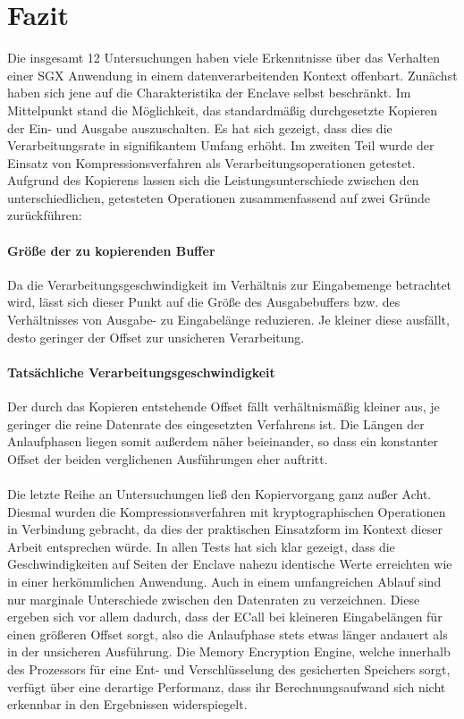 \section{Fazit}

Die insgesamt 12 Untersuchungen haben viele Erkenntnisse über das Verhalten einer \ac{SGX} Anwendung in einem datenverarbeitenden Kontext offenbart. Zunächst haben sich jene auf die Charakteristika der Enclave selbst beschränkt. Im Mittelpunkt stand die Möglichkeit, das standardmäßig durchgesetzte Kopieren der Ein- und Ausgabe auszuschalten. Es hat sich gezeigt, dass dies die Verarbeitungsrate in signifikantem Umfang erhöht. Im zweiten Teil wurde der Einsatz von Kompressionsverfahren als Verarbeitungsoperationen getestet. Aufgrund des Kopierens lassen sich die Leistungsunterschiede zwischen den unterschiedlichen, getesteten Operationen zusammenfassend auf zwei Gründe zurückführen:

\paragraph{Größe der zu kopierenden Buffer}
Da die Verarbeitungsgeschwindigkeit im Verhältnis zur Eingabemenge betrachtet wird, lässt sich dieser Punkt auf die Größe des Ausgabebuffers bzw. des Verhältnisses von Ausgabe- zu Eingabelänge reduzieren. Je kleiner diese ausfällt, desto geringer der Offset zur unsicheren Verarbeitung.

\paragraph{Tatsächliche Verarbeitungsgeschwindigkeit}
Der durch das Kopieren entstehende Offset fällt verhältnismäßig kleiner aus, je geringer die reine Datenrate des eingesetzten Verfahrens ist. Die Längen der Anlaufphasen liegen somit außerdem näher beieinander, so dass ein konstanter Offset der beiden verglichenen Ausführungen eher auftritt.

\paragraph{}
Die letzte Reihe an Untersuchungen ließ den Kopiervorgang ganz außer Acht. Diesmal wurden die Kompressionsverfahren mit kryptographischen Operationen in Verbindung gebracht, da dies der praktischen Einsatzform im Kontext dieser Arbeit entsprechen würde. In allen Tests hat sich klar gezeigt, dass die Geschwindigkeiten auf Seiten der Enclave nahezu identische Werte erreichten wie in einer herkömmlichen Anwendung. Auch in einem umfangreichen Ablauf sind nur marginale Unterschiede zwischen den Datenraten zu verzeichnen. Diese ergeben sich vor allem dadurch, dass der \ac{ECall} bei kleineren Eingabelängen für einen größeren Offset sorgt, also die Anlaufphase stets etwas länger andauert als in der unsicheren Ausführung. Die Memory Encryption Engine, welche innerhalb des Prozessors für eine Ent- und Verschlüsselung des gesicherten Speichers sorgt, verfügt über eine derartige Performanz, dass ihr Berechnungsaufwand sich nicht erkennbar in den Ergebnissen widerspiegelt.

